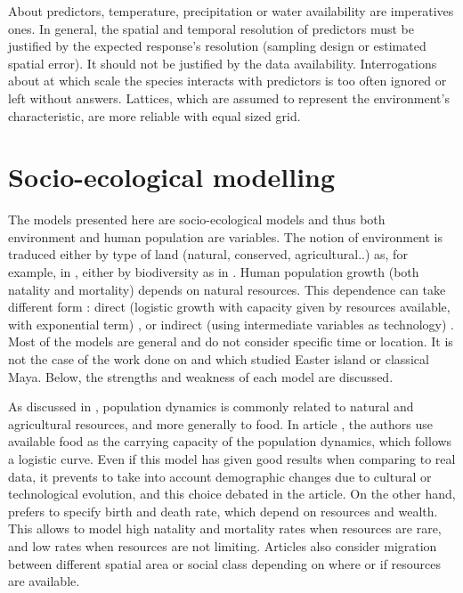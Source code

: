 \documentclass{article}
\begin{document}
About predictors, temperature, precipitation or water availability are imperatives ones. In general, the spatial and temporal resolution of predictors must be justified by the expected response's resolution (sampling design or estimated spatial error). It should not be justified by the data availability. Interrogations about at which scale the species interacts with predictors is too often ignored or left without answers. Lattices, which are assumed to represent the environment's characteristic, are more reliable with equal sized grid.




\newpage
\section{Socio-ecological modelling}
The models presented here are socio-ecological models and thus both environment and human population are variables. The notion of environment is traduced either by type of land (natural, conserved, agricultural..) as, for example, in \cite{henderson_ecological_2019, henderson_unequal_2021, bengochea_paz_agricultural_2020}, either by biodiversity as in \cite{lafuite_time-delayed_2017}. Human population growth (both natality and mortality) depends on natural resources. This dependence can take different form : direct (logistic growth with capacity given by resources available, with exponential term) \cite{bengochea_paz_agricultural_2020, lafuite_time-delayed_2017},  or indirect (using intermediate variables as technology) \cite{henderson_ecological_2019, henderson_unequal_2021}. Most of the models are general and do not consider specific time or location. It is not the case of the work done on \cite{roman_coupled_2017} and \cite{roman_dynamics_2018} which studied Easter island or classical Maya. Below, the strengths and weakness of each model are discussed.

\medskip
As discussed in \cite{henderson_ecological_2019}, population dynamics is commonly related to natural and agricultural resources, and more generally to food. In article \cite{bengochea_paz_agricultural_2020}, the authors use available food as the carrying capacity of the population dynamics, which follows a logistic curve. Even if this model has given good results when comparing to real data, it prevents to take into account demographic changes due to cultural or technological evolution, and this choice debated in the article. On the other hand, \cite{henderson_ecological_2019, roman_coupled_2017} prefers to specify birth and death rate, which depend on resources and wealth. This allows to model high natality and mortality rates when resources are rare, and low rates when resources are not limiting. Articles \cite{roman_coupled_2017, henderson_unequal_2021, roman_dynamics_2018} also consider migration between different spatial area or social class depending on where or if resources are available.
\end{document}
